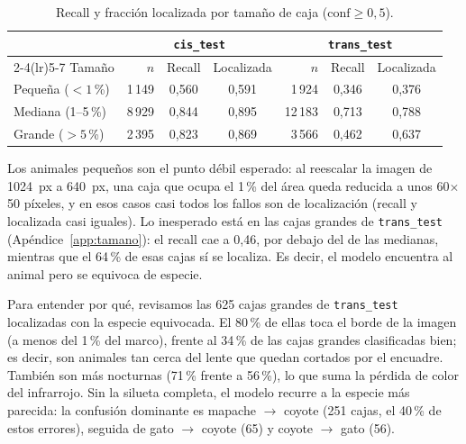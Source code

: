 \begin{table}[h]
  \centering
  \caption{Recall y fracción localizada por tamaño de caja ($\text{conf}\geq0{,}5$).}
  \label{tab:tamano}
  \begin{tabular}{lrccrcc}
    \toprule
     & \multicolumn{3}{c}{\texttt{cis\_test}} & \multicolumn{3}{c}{\texttt{trans\_test}} \\
    \cmidrule(lr){2-4}\cmidrule(lr){5-7}
    Tamaño & $n$ & Recall & Localizada & $n$ & Recall & Localizada \\
    \midrule
    Pequeña ($<1$\,\%)  & 1\,149 & 0,560 & 0,591 & 1\,924 & 0,346 & 0,376 \\
    Mediana (1--5\,\%)  & 8\,929 & 0,844 & 0,895 & 12\,183 & 0,713 & 0,788 \\
    Grande ($>5$\,\%)   & 2\,395 & 0,823 & 0,869 & 3\,566 & 0,462 & 0,637 \\
    \bottomrule
  \end{tabular}
\end{table}

Los animales pequeños son el punto débil esperado: al reescalar la imagen de
1024~px a 640~px, una caja que ocupa el 1\,\% del área queda reducida a unos
60$\times$50 píxeles, y en esos casos casi todos los fallos son de localización
(recall y localizada casi iguales). Lo inesperado está en las cajas grandes de
\texttt{trans\_test} (Apéndice~\ref{app:tamano}): el recall cae a 0,46, por
debajo del de las medianas, mientras que el 64\,\% de esas cajas sí se localiza.
Es decir, el modelo encuentra al animal pero se equivoca de especie.

Para entender por qué, revisamos las 625 cajas grandes de \texttt{trans\_test}
localizadas con la especie equivocada. El 80\,\% de ellas toca el borde de la
imagen (a menos del 1\,\% del marco), frente al 34\,\% de las cajas grandes
clasificadas bien; es decir, son animales tan cerca del lente que quedan
cortados por el encuadre. También son más nocturnas (71\,\% frente a 56\,\%),
lo que suma la pérdida de color del infrarrojo. Sin la silueta completa, el
modelo recurre a la especie más parecida: la confusión dominante es mapache
$\rightarrow$ coyote (251 cajas, el 40\,\% de estos errores), seguida de
gato $\rightarrow$ coyote (65) y coyote $\rightarrow$ gato (56).

